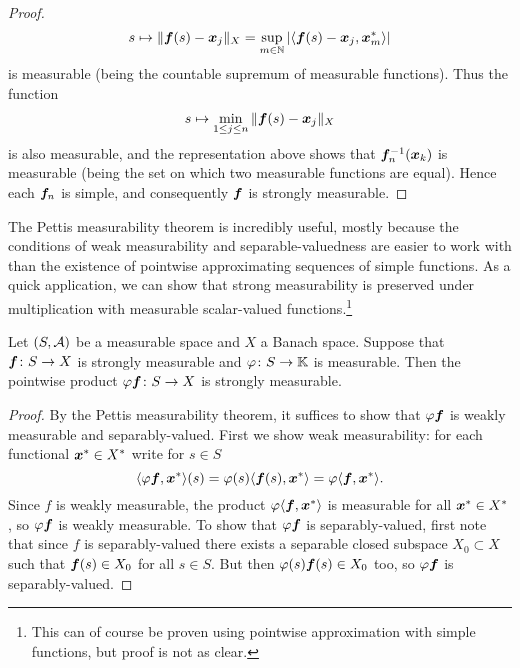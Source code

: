 \begin{proof}
\begin{equation*}
    s \mapsto \|\bm{f}(s) - \bm{x}_j\|_X = \sup_{m \in \mathbb{N}} |\langle \bm{f}(s) - \bm{x}_j, \bm{x}_m^* \rangle|
  \end{equation*}
  is measurable (being the countable supremum of measurable functions).
  Thus the function
  \begin{equation*}
    s \mapsto \min_{1 \leq j \leq n} \|\bm{f}(s) - \bm{x}_j\|_X
  \end{equation*}
  is also measurable, and the representation above shows that $\bm{f}_n^{-1}(\bm{x}_k)$ is measurable (being the set on which two measurable functions are equal).
  Hence each $\bm{f}_n$ is simple, and consequently $\bm{f}$ is strongly measurable.
\end{proof}

The Pettis measurability theorem is incredibly useful, mostly because the conditions of weak measurability and separable-valuedness are easier to work with than the existence of pointwise approximating sequences of simple functions.
As a quick application, we can show that strong measurability is preserved under multiplication with measurable scalar-valued functions.\footnote{This can of course be proven using pointwise approximation with simple functions, but proof is not as clear.}

\begin{cor}\label{cor:strong-meas-meas-mult}
  Let $(S,\mathcal{A})$ be a measurable space and $X$ a Banach space.
  Suppose that $\bm{f} \colon S \rightarrow X$ is strongly measurable and $\varphi \colon S \rightarrow \mathbb{K}$ is measurable.
  Then the pointwise product $\varphi \bm{f} \colon S \rightarrow X$ is strongly measurable.
\end{cor}

\begin{proof}
  By the Pettis measurability theorem, it suffices to show that $\varphi \bm{f}$ is weakly measurable and separably-valued. 
  First we show weak measurability: for each functional $\bm{x}^* \in X^*$ write for $s \in S$
  \begin{equation*}
    \langle \varphi \bm{f}, \bm{x}^* \rangle(s) = \varphi(s) \langle \bm{f}(s) , \bm{x}^* \rangle = \varphi \langle \bm{f}, \bm{x}^* \rangle.
  \end{equation*}
  Since $f$ is weakly measurable, the product $\varphi \langle \bm{f}, \bm{x}^* \rangle$ is measurable for all $\bm{x}^* \in X^*$, so $\varphi \bm{f}$ is weakly measurable.
  To show that $\varphi \bm{f}$ is separably-valued, first note that since $f$ is separably-valued there exists a separable closed subspace $X_0 \subset X$ such that $\bm{f}(s) \in X_0$ for all $s \in S$.
  But then $\varphi(s)\bm{f}(s) \in X_0$ too, so $\varphi \bm{f}$ is separably-valued.
\end{proof}

